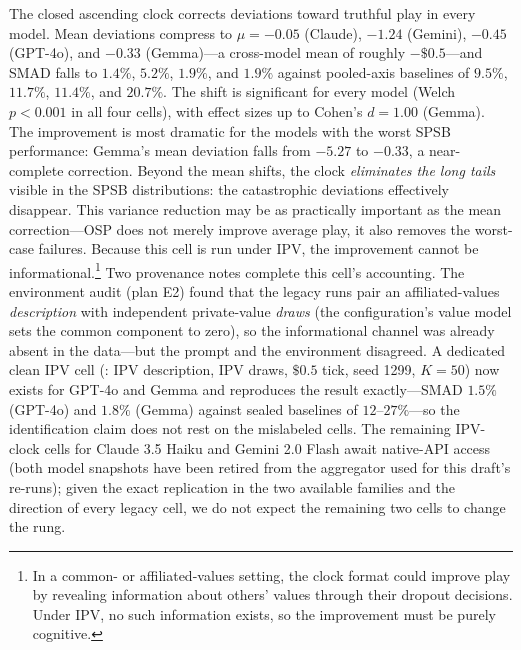 The closed ascending clock corrects deviations toward truthful play in every
model. Mean deviations compress to $\mu = -0.05$ (Claude), $-1.24$ (Gemini),
$-0.45$ (GPT-4o), and $-0.33$ (Gemma)---a cross-model mean of roughly
$-\$0.5$---and SMAD falls to $1.4\%$, $5.2\%$, $1.9\%$, and $1.9\%$ against
pooled-axis baselines of $9.5\%$, $11.7\%$, $11.4\%$, and $20.7\%$. The shift
is significant for every model (Welch $p < 0.001$ in all four cells), with
effect sizes up to Cohen's $d = 1.00$ (Gemma). The improvement is most
dramatic for the models with the worst SPSB performance: Gemma's mean
deviation falls from $-5.27$ to $-0.33$, a near-complete correction. Beyond
the mean shifts, the clock \emph{eliminates the long tails} visible in the
SPSB distributions: the catastrophic deviations effectively disappear. This
variance reduction may be as practically important as the mean
correction---OSP does not merely improve average play, it also removes the
worst-case failures. Because this cell is run under IPV, the improvement
cannot be informational.\footnote{In a common- or affiliated-values setting,
the clock format could improve play by revealing information about others'
values through their dropout decisions. Under IPV, no such information
exists, so the improvement must be purely cognitive.}
Two provenance notes complete this cell's accounting. The environment audit
(plan E2) found that the legacy  runs pair an
affiliated-values \emph{description} with independent private-value
\emph{draws} (the configuration's value model sets the common component to
zero), so the informational channel was already absent in the data---but the
prompt and the environment disagreed. A dedicated clean IPV cell
(: IPV description, IPV draws, $\$0.5$
tick, seed 1299, $K = 50$) now exists for GPT-4o and Gemma and reproduces
the result exactly---SMAD $1.5\%$ (GPT-4o) and $1.8\%$ (Gemma) against
sealed baselines of $12$--$27\%$---so the identification claim does not rest
on the mislabeled cells. The remaining IPV-clock cells for Claude 3.5 Haiku and Gemini
2.0 Flash await native-API access (both model snapshots have been retired
from the aggregator used for this draft's re-runs); given the exact
replication in the two available families and the direction of every legacy
cell, we do not expect the remaining two cells to change the rung.

